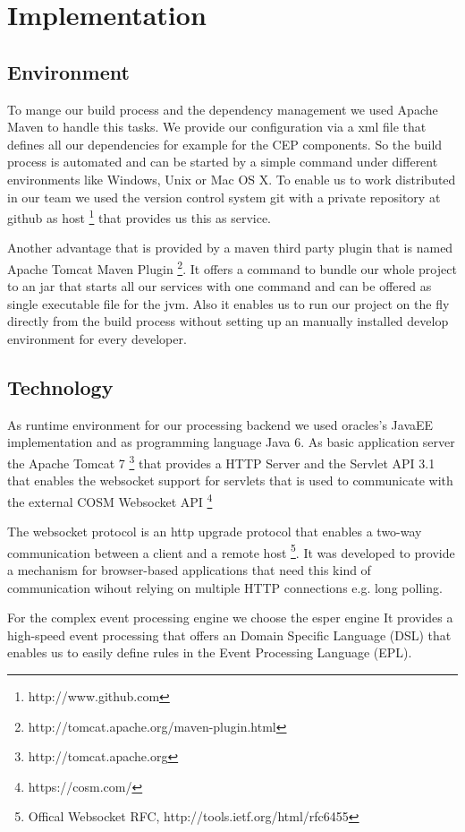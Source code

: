 \documentclass{acm_proc_article-sp}
\begin{document}
\section{Implementation}
\label{sec:Implementation}

\subsection{Environment}
To mange our build process and the dependency management we used Apache Maven to handle this tasks. We provide our configuration via a xml file that defines all our  dependencies for example for the CEP components.
So the build process is automated and can be started by a simple command under different environments like Windows, Unix or Mac OS X.
To enable us to work distributed in our team we used the version control system git with a private repository at github as host
\footnote{http://www.github.com}
that provides us this as service.

Another advantage that is provided by a maven third party plugin that is named Apache Tomcat Maven Plugin
\footnote{http://tomcat.apache.org/maven-plugin.html}.
It offers a command to bundle our whole project to an jar that starts all our services with one command and can be offered as single executable file for the jvm.
Also it enables us to run our project on the fly directly from the build process without setting up an manually installed develop environment for every developer.

\subsection{Technology}
As runtime environment for our processing backend we used oracles's JavaEE implementation and as programming language Java 6. As basic application server the Apache Tomcat 7 \footnote{http://tomcat.apache.org} that provides a HTTP Server and the Servlet API 3.1 that enables the websocket support for servlets that is used to communicate with the external COSM Websocket API
\footnote{https://cosm.com/}

The websocket protocol is an http upgrade protocol that enables a two-way communication between a client and a remote host
\footnote{Offical Websocket RFC, http://tools.ietf.org/html/rfc6455}. It was developed to provide a mechanism for browser-based applications that need this kind of communication wihout relying on multiple HTTP connections e.g. long polling. 

For the complex event processing engine we choose the esper engine\cite{esper}
It provides a high-speed event processing that offers an Domain Specific Language (DSL) that enables us to easily define rules in the Event Processing Language (EPL).
\end{document}
